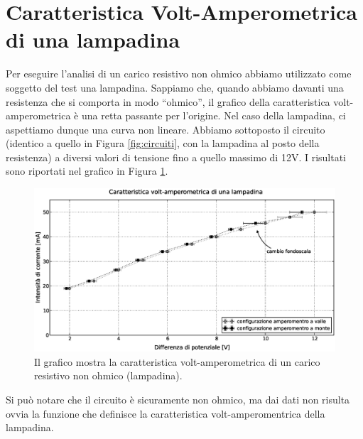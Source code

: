\section{Caratteristica Volt-Amperometrica di una lampadina}
Per eseguire l'analisi di un carico resistivo non ohmico abbiamo utilizzato come soggetto del test una lampadina. Sappiamo che, quando abbiamo davanti una resistenza che si comporta in modo ``ohmico'', il grafico della caratteristica volt-amperometrica è una retta passante per l'origine. Nel caso della lampadina, ci aspettiamo dunque una curva non lineare. Abbiamo sottoposto il circuito (identico a quello in Figura \ref{fig:circuiti}, con la lampadina al posto della resistenza) a diversi valori di tensione fino a quello massimo di 12V. I risultati sono riportati nel grafico in Figura \ref{fig:lampadina}.

\begin{figure}[h]
    \centering
        \includegraphics[width=\textwidth]{lamp.eps}
        \caption{Il grafico mostra la caratteristica volt-amperometrica di un carico resistivo non ohmico (lampadina).}
        \label{fig:lampadina}
\end{figure}

Si può notare che il circuito è sicuramente non ohmico, ma dai dati non risulta ovvia la funzione che definisce la caratteristica volt-amperomentrica della lampadina.